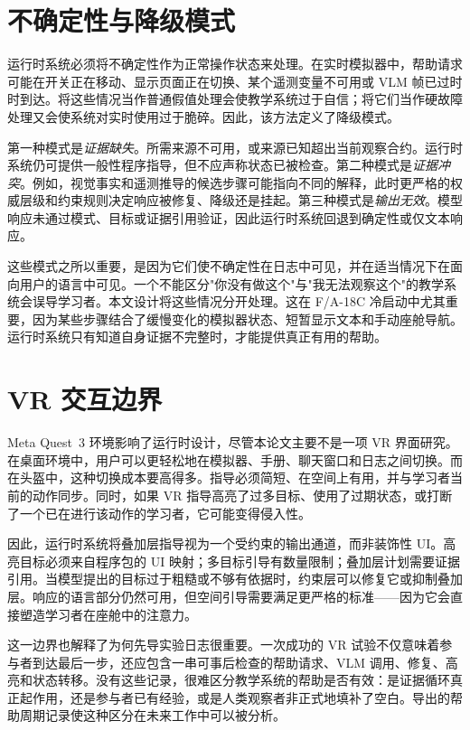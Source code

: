 \section{不确定性与降级模式}\label{sec:design-degradation}

运行时系统必须将不确定性作为正常操作状态来处理。在实时模拟器中，帮助请求可能在开关正在移动、显示页面正在切换、某个遥测变量不可用或 VLM 帧已过时时到达。将这些情况当作普通假值处理会使教学系统过于自信；将它们当作硬故障处理又会使系统对实时使用过于脆碎。因此，该方法定义了降级模式。

第一种模式是\emph{证据缺失}。所需来源不可用，或来源已知超出当前观察合约。运行时系统仍可提供一般性程序指导，但不应声称状态已被检查。第二种模式是\emph{证据冲突}。例如，视觉事实和遥测推导的候选步骤可能指向不同的解释，此时更严格的权威层级和约束规则决定响应被修复、降级还是挂起。第三种模式是\emph{输出无效}。模型响应未通过模式、目标或证据引用验证，因此运行时系统回退到确定性或仅文本响应。

这些模式之所以重要，是因为它们使不确定性在日志中可见，并在适当情况下在面向用户的语言中可见。一个不能区分"你没有做这个"与"我无法观察这个"的教学系统会误导学习者。本文设计将这些情况分开处理。这在 F/A-18C 冷启动中尤其重要，因为某些步骤结合了缓慢变化的模拟器状态、短暂显示文本和手动座舱导航。运行时系统只有知道自身证据不完整时，才能提供真正有用的帮助。

\section{VR 交互边界}\label{sec:design-vr-boundary}

Meta Quest~3 环境影响了运行时设计，尽管本论文主要不是一项 VR 界面研究。在桌面环境中，用户可以更轻松地在模拟器、手册、聊天窗口和日志之间切换。而在头盔中，这种切换成本要高得多。指导必须简短、在空间上有用，并与学习者当前的动作同步。同时，如果 VR 指导高亮了过多目标、使用了过期状态，或打断了一个已在进行该动作的学习者，它可能变得侵入性。

因此，运行时系统将叠加层指导视为一个受约束的输出通道，而非装饰性 UI。高亮目标必须来自程序包的 UI 映射；多目标引导有数量限制；叠加层计划需要证据引用。当模型提出的目标过于粗糙或不够有依据时，约束层可以修复它或抑制叠加层。响应的语言部分仍然可用，但空间引导需要满足更严格的标准——因为它会直接塑造学习者在座舱中的注意力。

这一边界也解释了为何先导实验日志很重要。一次成功的 VR 试验不仅意味着参与者到达最后一步，还应包含一串可事后检查的帮助请求、VLM 调用、修复、高亮和状态转移。没有这些记录，很难区分教学系统的帮助是否有效：是证据循环真正起作用，还是参与者已有经验，或是人类观察者非正式地填补了空白。导出的帮助周期记录使这种区分在未来工作中可以被分析。

